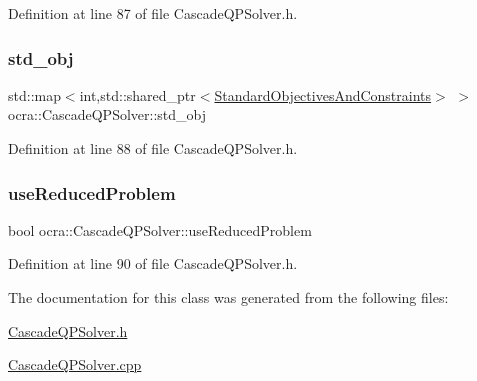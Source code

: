 Definition at line 87 of file Cascade\+Q\+P\+Solver.\+h.

\hypertarget{classocra_1_1CascadeQPSolver_aafe2d2d5226c421fc53880570a25a665}{}\label{classocra_1_1CascadeQPSolver_aafe2d2d5226c421fc53880570a25a665} 
\subsubsection{\texorpdfstring{std\+\_\+obj}{std\_obj}}
{\footnotesize\ttfamily std\+::map$<$int,std\+::shared\+\_\+ptr$<$\hyperlink{structocra_1_1CascadeQPSolver_1_1StandardObjectivesAndConstraints}{Standard\+Objectives\+And\+Constraints}$>$ $>$ ocra\+::\+Cascade\+Q\+P\+Solver\+::std\+\_\+obj\hspace{0.3cm}{\ttfamily [protected]}}



Definition at line 88 of file Cascade\+Q\+P\+Solver.\+h.

\hypertarget{classocra_1_1CascadeQPSolver_a8703a516e8ce6adb088867d8b39dfa4d}{}\label{classocra_1_1CascadeQPSolver_a8703a516e8ce6adb088867d8b39dfa4d} 
\subsubsection{\texorpdfstring{use\+Reduced\+Problem}{useReducedProblem}}
{\footnotesize\ttfamily bool ocra\+::\+Cascade\+Q\+P\+Solver\+::use\+Reduced\+Problem\hspace{0.3cm}{\ttfamily [protected]}}



Definition at line 90 of file Cascade\+Q\+P\+Solver.\+h.



The documentation for this class was generated from the following files\+:\begin{DoxyCompactItemize}
\item 
\hyperlink{CascadeQPSolver_8h}{Cascade\+Q\+P\+Solver.\+h}\item 
\hyperlink{CascadeQPSolver_8cpp}{Cascade\+Q\+P\+Solver.\+cpp}\end{DoxyCompactItemize}
